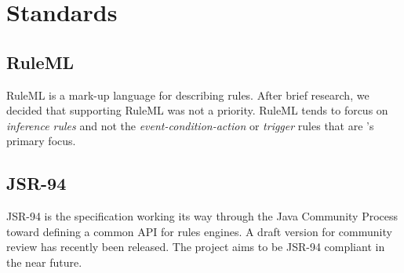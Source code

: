 \section{Standards}

\subsection{RuleML}

RuleML is a mark-up language for describing rules.  After brief
research, we decided that supporting RuleML was not a priority.
RuleML tends to forcus on \emph{inference rules} and not the
\emph{event-condition-action} or \emph{trigger} rules that
are \drools{}'s primary focus.

\subsection{JSR-94}

JSR-94 is the specification working its way through the Java Community
Process toward defining a common API for rules engines.  A draft
version for community review has recently been released.  The
\drools{} project aims to be JSR-94 compliant in the near future.

